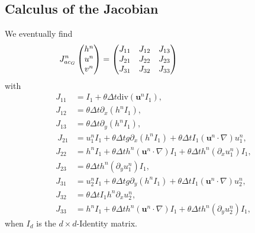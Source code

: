 \documentclass[a4paper, 11pt]{report}
\begin{document}
\subsection{Calculus of the Jacobian}
We eventually find
\begin{equation*}
\hspace*{-3cm}J_{ac_G}^n\begin{pmatrix}h^n\\u^n\\v^n\end{pmatrix}=
\begin{pmatrix}
J_{11} & J_{12} & J_{13} \\
J_{21}& J_{22}& J_{23}\\
J_{31}& J_{32}& J_{33}
\end{pmatrix}
\end{equation*}
with
\begin{align*}
J_{11} &=  I_1+\theta\Delta t\text{div}\left(\boldsymbol{u}^nI_1\right),\\
J_{12} & = \theta\Delta t\partial_x\left(h^nI_1\right),\\
J_{13} & =\theta\Delta t\partial_y\left(h^nI_1\right),\\\
J_{21} &= u^n_1I_1+\theta\Delta t g\partial_x\left(h^nI_1\right)+\theta\Delta tI_1\left(\boldsymbol{u}^n\cdot\nabla\right)u_1^n,\\
J_{22} &= h^nI_1+\theta\Delta th^n\left(\boldsymbol{u}^n\cdot \nabla\right)I_1+\theta\Delta th^n(\partial_xu_1^n)I_1,\\
J_{23} &= \theta\Delta th^n(\partial_yu_1^n)I_1,\\
J_{31} &= u_2^nI_1+\theta\Delta tg\partial_y\left(h^nI_1\right)+\theta\Delta tI_1\left(\boldsymbol{u}^n\cdot\nabla\right)u_2^n,\\
J_{32} &= \theta\Delta tI_1h^n\partial_xu_2^n,\\
J_{33} &= h^nI_1+\theta\Delta th^n\left(\boldsymbol{u}^n\cdot\nabla\right)I_1+\theta\Delta th^n(\partial_yu_2^n)I_1,
\end{align*}
when $I_d$ is the $d\times d$-Identity matrix.\\
\end{document}
